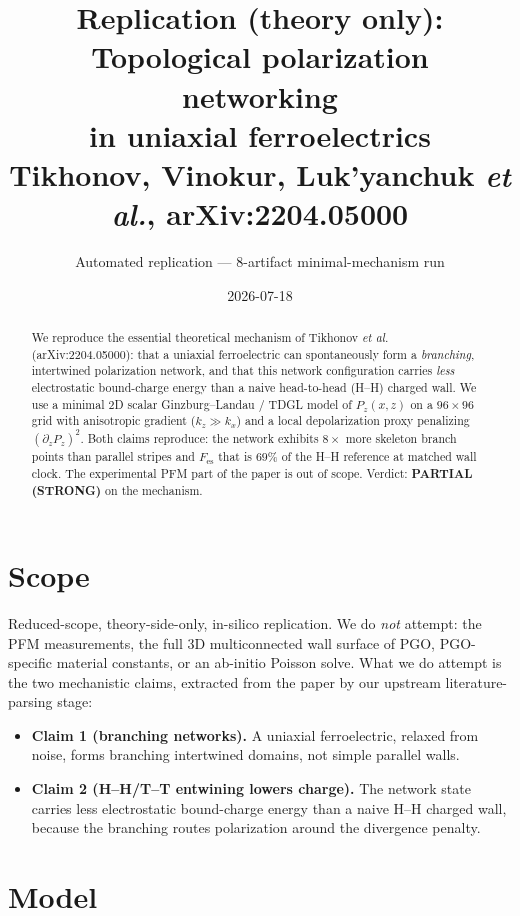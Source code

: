 \documentclass[10pt]{article}
\title{Replication (theory only): Topological polarization networking\\ in uniaxial ferroelectrics\\ \large Tikhonov, Vinokur, Luk'yanchuk \emph{et al.}, arXiv:2204.05000}
\author{Automated replication --- 8-artifact minimal-mechanism run}
\date{2026-07-18}
\begin{document}
\maketitle

\begin{abstract}
We reproduce the essential theoretical mechanism of Tikhonov \emph{et al.} (arXiv:2204.05000):
that a uniaxial ferroelectric can spontaneously form a \emph{branching}, intertwined
polarization network, and that this network configuration carries \emph{less} electrostatic
bound-charge energy than a naive head-to-head (H--H) charged wall. We use a minimal 2D
scalar Ginzburg--Landau / TDGL model of $P_z(x,z)$ on a $96\times96$ grid with
anisotropic gradient ($k_z\!\gg\!k_x$) and a local depolarization proxy penalizing
$(\partial_z P_z)^2$. Both claims reproduce: the network exhibits
$8\times$ more skeleton branch points than parallel stripes and $F_{\text{es}}$
that is $69\%$ of the H--H reference at matched wall clock. The experimental PFM
part of the paper is out of scope. Verdict: \textbf{PARTIAL (STRONG)} on the mechanism.
\end{abstract}

\section{Scope}
Reduced-scope, theory-side-only, in-silico replication. We do \emph{not} attempt:
the PFM measurements, the full 3D multiconnected wall surface of PGO, PGO-specific
material constants, or an ab-initio Poisson solve. What we do attempt is the two
mechanistic claims, extracted from the paper by our upstream literature-parsing
stage:

\begin{itemize}
  \item \textbf{Claim 1 (branching networks).} A uniaxial ferroelectric, relaxed
        from noise, forms branching intertwined domains, not simple parallel walls.
  \item \textbf{Claim 2 (H--H/T--T entwining lowers charge).} The network state
        carries less electrostatic bound-charge energy than a naive H--H charged
        wall, because the branching routes polarization around the divergence
        penalty.
\end{itemize}

\section{Model}
\end{document}
